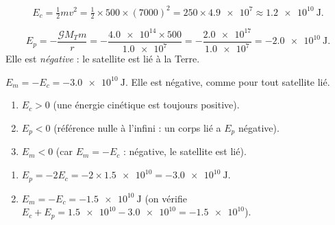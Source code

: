 \documentclass[11pt,a4paper]{article}
\begin{document}

\begin{corrige}
\[
E_c=\tfrac12 m v^2=\tfrac12\times 500\times(7000)^2
   =250\times\num{4.9e7}\approx\qty{1.2e10}{\joule}.
\]
\end{corrige}

\begin{corrige}
\[
E_p=-\frac{\mathcal{G}M_T m}{r}=-\frac{\num{4.0e14}\times 500}{\num{1.0e7}}
   =-\frac{\num{2.0e17}}{\num{1.0e7}}=-\qty{2.0e10}{\joule}.
\]
Elle est \emph{négative} : le satellite est lié à la Terre.
\end{corrige}

\begin{corrige}
$E_m=-E_c=-\qty{3.0e10}{\joule}$. Elle est négative, comme pour tout satellite lié.
\end{corrige}

\begin{corrige}
\begin{enumerate}[label=\alph*)]
  \item $E_c>0$ (une énergie cinétique est toujours positive).
  \item $E_p<0$ (référence nulle à l'infini : un corps lié a $E_p$ négative).
  \item $E_m<0$ (car $E_m=-E_c$ : négative, le satellite est lié).
\end{enumerate}
\end{corrige}

\begin{corrige}
\begin{enumerate}[label=\alph*)]
  \item $E_p=-2E_c=-2\times\num{1.5e10}=-\qty{3.0e10}{\joule}$.
  \item $E_m=-E_c=-\qty{1.5e10}{\joule}$ (on vérifie $E_c+E_p=\num{1.5e10}-\num{3.0e10}=-\num{1.5e10}$).
\end{enumerate}
\end{corrige}
\end{document}
